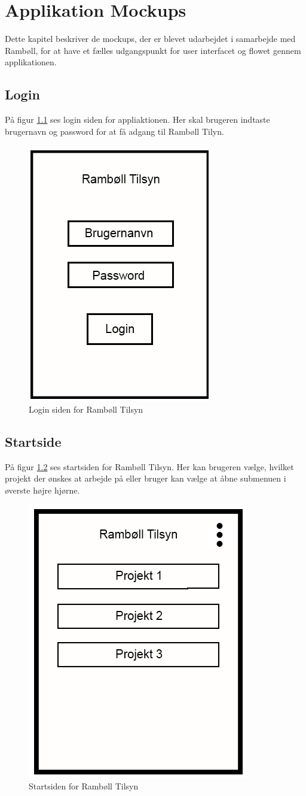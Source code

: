 \chapter{Applikation Mockups}
Dette kapitel beskriver de mockups, der er blevet udarbejdet i samarbejde med Rambøll, for at have et fælles udgangspunkt for user interfacet og flowet gennem applikationen. \\

\section{Login}\label{sec:LoginMock}
På figur \ref{fig:LoginMock} ses login siden for appliaktionen. Her skal brugeren indtaste brugernavn og password for at få adgang til Rambøll Tilyn.
\begin{figure}[H]
	\centering
	\includegraphics[width=0.4\linewidth]{MockUps/Mock/Ramboell-Login}
	\caption{Login siden for Rambøll Tilsyn}
	\label{fig:LoginMock}
\end{figure}

\clearpage

\section{Startside}\label{sec:StartMock}
På figur \ref{fig:StartMock} ses startsiden for Rambøll Tilsyn. Her kan brugeren vælge, hvilket projekt der ønskes at arbejde på eller bruger kan vælge at åbne submenuen i øverste højre hjørne.
\begin{figure}[H]
	\centering
	\includegraphics[width=0.4\linewidth]{MockUps/Mock/Ramboell-Startside}
	\caption{Startsiden for Rambøll Tilsyn}
	\label{fig:StartMock}
\end{figure}

